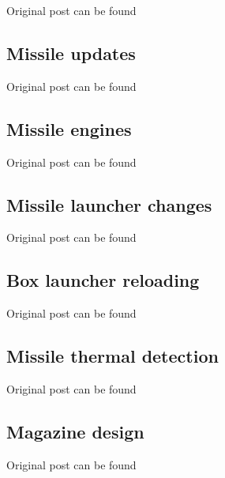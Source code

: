 \documentclass[../Aurora C# unofficial manual.tex]{subfiles}
\begin{document}
	Original post can be found
	
	\subsection{Missile updates}
	Original post can be found
	
	\subsection{Missile engines}
	Original post can be found
	
	\subsection{Missile launcher changes}
	Original post can be found
	
	\subsection{Box launcher reloading}
	Original post can be found
	
	\subsection{Missile thermal detection}
	Original post can be found
	
	\subsection{Magazine design}
	Original post can be found
	
\end{document}
